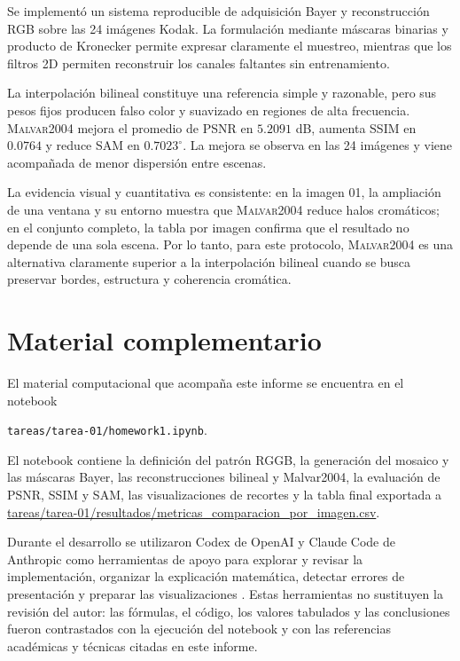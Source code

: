 \documentclass[11pt,a4paper]{article}
\newcommand{\malvar}{\textsc{Malvar2004}}
\begin{document}
Se implementó un sistema reproducible de adquisición Bayer y reconstrucción RGB sobre las 24 imágenes Kodak. La formulación mediante máscaras binarias y producto de Kronecker permite expresar claramente el muestreo, mientras que los filtros 2D permiten reconstruir los canales faltantes sin entrenamiento.

La interpolación bilineal constituye una referencia simple y razonable, pero sus pesos fijos producen falso color y suavizado en regiones de alta frecuencia. \malvar{} mejora el promedio de PSNR en $5.2091$ dB, aumenta SSIM en $0.0764$ y reduce SAM en $0.7023^\circ$. La mejora se observa en las 24 imágenes y viene acompañada de menor dispersión entre escenas.

La evidencia visual y cuantitativa es consistente: en la imagen 01, la ampliación de una ventana y su entorno muestra que \malvar{} reduce halos cromáticos; en el conjunto completo, la tabla por imagen confirma que el resultado no depende de una sola escena. Por lo tanto, para este protocolo, \malvar{} es una alternativa claramente superior a la interpolación bilineal cuando se busca preservar bordes, estructura y coherencia cromática.

\section{Material complementario}

El material computacional que acompaña este informe se encuentra en el notebook
\begin{center}
\texttt{tareas/tarea-01/homework1.ipynb}.
\end{center}
El notebook contiene la definición del patrón RGGB, la generación del mosaico y
las máscaras Bayer, las reconstrucciones bilineal y Malvar2004, la evaluación de
PSNR, SSIM y SAM, las visualizaciones de recortes y la tabla final exportada a
\url{tareas/tarea-01/resultados/metricas_comparacion_por_imagen.csv}.

Durante el desarrollo se utilizaron Codex de OpenAI y Claude Code de Anthropic
como herramientas de apoyo para explorar y revisar la implementación, organizar
la explicación matemática, detectar errores de presentación y preparar las
visualizaciones \cite{openai-codex,claude-code}. Estas herramientas no sustituyen
la revisión del autor: las fórmulas, el código, los valores tabulados y las
conclusiones fueron contrastados con la ejecución del notebook y con las
referencias académicas y técnicas citadas en este informe.
\end{document}
